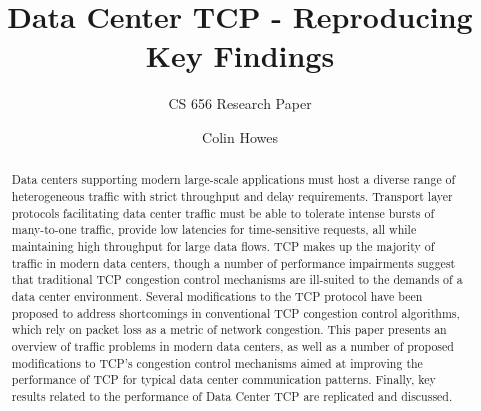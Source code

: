 \documentclass[sigconf]{acmart}
\begin{document}
\title{Data Center TCP - Reproducing Key Findings}
\subtitle{CS 656 Research Paper}

\author{Colin Howes}

\begin{abstract}

Data centers supporting modern large-scale applications must host a diverse range of heterogeneous traffic with strict throughput and delay requirements. Transport layer protocols facilitating data center traffic must be able to tolerate intense bursts of many-to-one traffic, provide low latencies for time-sensitive requests, all while maintaining high throughput for large data flows. TCP makes up the majority of traffic in modern data centers, though a number of performance impairments suggest that traditional TCP congestion control mechanisms are ill-suited to the demands of a data center environment. Several modifications to the TCP protocol have been proposed to address shortcomings in conventional TCP congestion control algorithms, which rely on packet loss as a metric of network congestion. This paper presents an overview of traffic problems in modern data centers, as well as a number of proposed modifications to TCP's congestion control mechanisms aimed at improving the performance of TCP for typical data center communication patterns. Finally, key results related to the performance of Data Center TCP are replicated and discussed.

\end{abstract}

\maketitle




 
\end{document}
